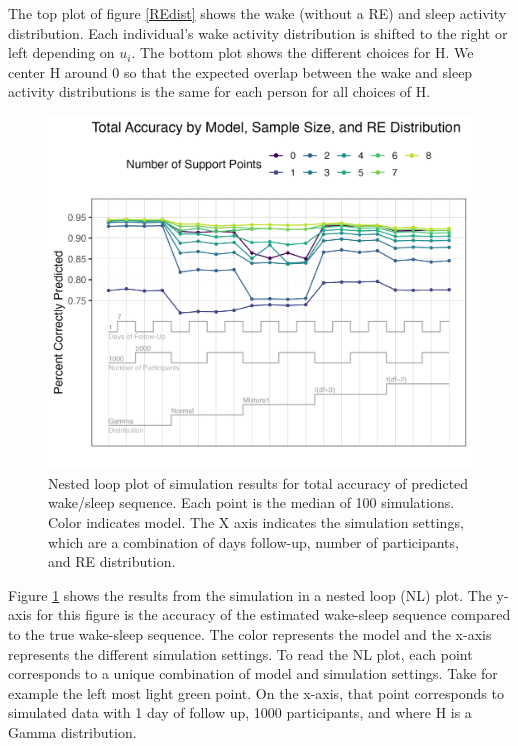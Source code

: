 \documentclass{article}
\begin{document}
The top plot of figure \ref{REdist} shows the wake (without a RE) and sleep activity distribution. Each individual's wake activity distribution is shifted to the right or left depending on $u_i$. The bottom plot shows the different choices for H. We center H around 0 so that the expected overlap between the wake and sleep activity distributions is the same for each person for all choices of H. 

\begin{figure}
    \includegraphics[scale=.8]{Support/NestedLoopAcc.png}
    \centering
    \caption{Nested loop plot of simulation results for total accuracy of predicted wake/sleep sequence. Each point is the median of 100 simulations. Color indicates model. The X axis indicates the simulation settings, which are a combination of days follow-up, number of participants, and RE distribution.}
    \label{NLacc}
\end{figure}
    
Figure \ref{NLacc} shows the results from the simulation in a nested loop (NL) plot. The y-axis for this figure is the accuracy of the estimated wake-sleep sequence compared to the true wake-sleep sequence. The color represents the model and the x-axis represents the different simulation settings. To read the NL plot, each point corresponds to a unique combination of model and simulation settings. Take for example the left most light green point. On the x-axis, that point corresponds to simulated data with 1 day of follow up, 1000 participants, and where H is a Gamma distribution.
\end{document}
